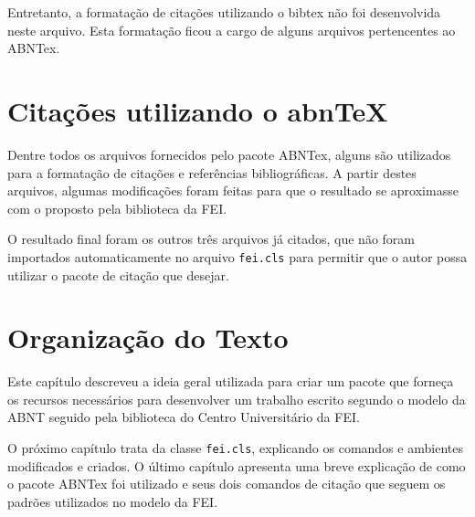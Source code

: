 Entretanto, a formatação de citações utilizando o bibtex não foi desenvolvida neste arquivo. Esta formatação ficou a cargo de alguns arquivos pertencentes ao ABNTex.

\section{Citações utilizando o abn\TeX}

Dentre todos os arquivos fornecidos pelo pacote ABNTex, alguns são utilizados para a formatação de citações e referências bibliográficas. A partir destes arquivos, algumas modificações foram feitas para que o resultado se aproximasse com o proposto pela biblioteca da FEI.

O resultado final foram os outros três arquivos já citados, que não foram importados automaticamente no arquivo \texttt{fei.cls} para permitir que o autor possa utilizar o pacote de citação que desejar.

\section{Organização do Texto}

Este capítulo descreveu a ideia geral utilizada para criar um pacote que forneça os recursos necessários para desenvolver um trabalho escrito segundo o modelo da ABNT seguido pela biblioteca do Centro Universitário da FEI.

O próximo capítulo trata da classe \texttt{fei.cls}, explicando os comandos e ambientes modificados e criados. O último capítulo apresenta uma breve explicação de como o pacote ABNTex foi utilizado e seus dois comandos de citação que seguem os padrões utilizados no modelo da FEI.

